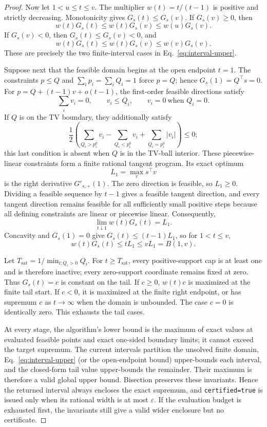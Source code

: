 \documentclass[preprint,review,12pt]{elsarticle}
\begin{document}
\begin{proof}
Now let \(1<u\leq t\leq v\). The multiplier \(w(t)=t/(t-1)\) is positive and
strictly decreasing. Monotonicity gives \(G_s(t)\leq G_s(v)\). If
\(G_s(v)\geq0\), then
\[
w(t)G_s(t)\leq w(t)G_s(v)\leq w(u)G_s(v).
\]
If \(G_s(v)<0\), then \(G_s(t)\leq G_s(v)<0\), and
\[
w(t)G_s(t)\leq w(t)G_s(v)\leq w(v)G_s(v).
\]
These are precisely the two finite-interval cases in
Eq.~\eqref{eq:interval-upper}.

Suppose next that the feasible domain begins at the open endpoint \(t=1\).
The constraints \(p\leq Q\) and \(\sum_i p_i=\sum_i Q_i=1\) force \(p=Q\);
hence \(G_s(1)=Q^\top s=0\). For \(p=Q+(t-1)v+o(t-1)\), the first-order
feasible directions satisfy
\[
\sum_i v_i=0,\qquad
v_i\leq Q_i,\qquad
v_i=0\ \text{when }Q_i=0.
\]
If \(Q\) is on the TV boundary, they additionally satisfy
\[
\frac12\left(
\sum_{Q_i>p_i^0}v_i-\sum_{Q_i<p_i^0}v_i
+\sum_{Q_i=p_i^0}|v_i|
\right)\leq0;
\]
this last condition is absent when \(Q\) is in the TV-ball interior. These
piecewise-linear constraints form a finite rational tangent program. Its exact
optimum
\[
L_1=\max_v s^\top v
\]
is the right derivative \(G'_{s,+}(1)\). The zero direction is feasible, so
\(L_1\geq0\). Dividing a feasible sequence by
\(t-1\) gives a feasible tangent direction, and every tangent direction remains
feasible for all sufficiently small positive steps because all defining
constraints are linear or piecewise linear. Consequently,
\[
\lim_{t\downarrow1}w(t)G_s(t)=L_1.
\]
Concavity and \(G_s(1)=0\) give
\(G_s(t)\leq(t-1)L_1\), so for \(1<t\leq v\),
\[
w(t)G_s(t)\leq tL_1\leq vL_1=B(1,v).
\]

Let \(T_{\mathrm{sat}}=1/\min_{i:Q_i>0}Q_i\). For
\(t\geq T_{\mathrm{sat}}\), every positive-support cap is at least one and is
therefore inactive; every zero-support coordinate remains fixed at zero.
Thus \(G_s(t)=c\) is constant on the tail. If \(c\geq0\), \(w(t)c\) is
maximized at the finite tail start. If \(c<0\), it is maximized at the finite
right endpoint, or has supremum \(c\) as \(t\to\infty\) when the domain is
unbounded. The case \(c=0\) is identically zero. This exhausts the tail cases.

At every stage, the algorithm's lower bound is the maximum of exact values at
evaluated feasible points and exact one-sided boundary limits; it cannot exceed
the target supremum. The current intervals partition the unsolved finite
domain, Eq.~\eqref{eq:interval-upper} (or the open-endpoint bound) upper-bounds
each interval, and the closed-form tail value upper-bounds the remainder.
Their maximum is therefore a valid global upper bound. Bisection preserves
these invariants. Hence the returned interval always encloses the exact
supremum, and \texttt{certified=true} is issued only when its rational width is
at most \(\varepsilon\). If the evaluation budget is exhausted first, the
invariants still give a valid wider enclosure but no certificate.
\end{proof}
\end{document}
